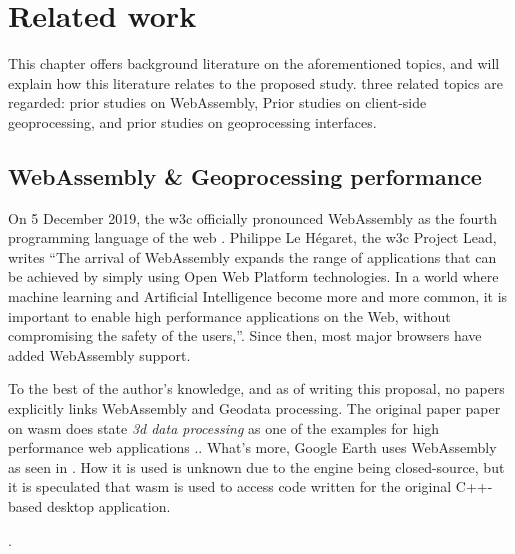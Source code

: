 \newpage

\section{Related work}

This chapter offers background literature on the aforementioned topics, and will explain how this literature relates to the proposed study. three related topics are regarded: prior studies on WebAssembly, Prior studies on client-side geoprocessing, and prior studies on geoprocessing interfaces.


\subsection{WebAssembly \& Geoprocessing performance}


On 5 December 2019, the \ac{w3c} officially pronounced WebAssembly as the fourth programming language of the web \cite{w3c_world_2019}. Philippe Le Hégaret, the \ac{w3c} Project Lead, writes “The arrival of WebAssembly expands the range of applications that can be achieved by simply using Open Web Platform technologies. In a world where machine learning and Artificial Intelligence become more and more common, it is important to enable high performance applications on the Web, without compromising the safety of the users,”. Since then, most major browsers have added WebAssembly support.

To the best of the author's knowledge, and as of writing this proposal, no papers explicitly links WebAssembly and Geodata processing. The original paper paper on \ac{wasm} does state \textit{3d data processing} as one of the examples for high performance web applications \cite{haas_bringing_2017}.. What's more, Google Earth uses WebAssembly as seen in  \cite{google_google_2020}. How it is used is unknown due to the engine being closed-source, but it is speculated that \ac{wasm} is used to access code written for the original C++-based desktop application.


\cite{jangda_not_2019, haas_bringing_2017}.

